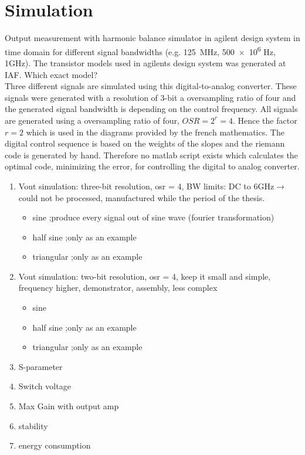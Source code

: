 \chapter{Simulation}
Output measurement with harmonic balance simulator in agilent design system in time domain for different signal bandwidths (e.g. \SI{125}{\MHz}, \num{500e6} Hz, 1GHz). The transistor models used in agilents design system was generated at IAF. Which exact model?\\
Three different signals are simulated using this digital-to-analog converter. These signals were generated with a resolution of 3-bit a oversampling ratio of four and the generated signal bandwidth is depending on the control frequency.
All signals are generated using a oversampling ratio of four, $OSR = 2^{r} = 4$. Hence the factor $r = 2$ which is used in the diagrams provided by the french mathematics. The digital control sequence is based on the weights of the slopes and the riemann code is generated by hand. Therefore no matlab script exists which calculates the optimal code, minimizing the error, for controlling the digital to analog converter. 
\begin{enumerate}
	\item Vout simulation: three-bit resolution, osr = 4, BW limits: DC to 6GHz$\rightarrow$ could not be processed, manufactured while the period of the thesis. 
	\begin{itemize}
		\item sine ;produce every signal out of sine wave (fourier transformation)
		\item half sine ;only as an example
		\item triangular ;only as an example
	\end{itemize}
	\item Vout simulation: two-bit resolution, osr = 4, keep it small and simple, frequency higher, demonstrator, assembly, less complex
	\begin{itemize}
		\item sine
		\item half sine ;only as an example
		\item triangular ;only as an example
	\end{itemize}
	\item S-parameter		
	\item Switch voltage
	\item Max Gain with output amp
	\item stability
	\item energy consumption
\end{enumerate}
